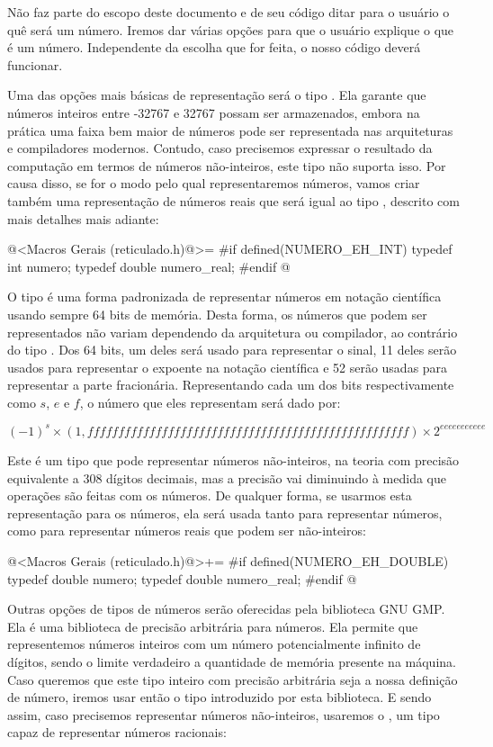 Não faz parte do escopo deste documento e de seu código ditar para o
usuário o quê será um número. Iremos dar várias opções para que o
usuário explique o que é um número. Independente da escolha que for
feita, o nosso código deverá funcionar.

Uma das opções mais básicas de representação será o
tipo . Ela garante que números inteiros entre -32767 e
32767 possam ser armazenados, embora na prática uma faixa bem maior de
números pode ser representada nas arquiteturas e compiladores
modernos. Contudo, caso precisemos expressar o resultado da computação
em termos de números não-inteiros, este tipo não suporta isso. Por
causa disso, se  for o modo pelo qual representaremos
números, vamos criar também uma representação de números reais que
será igual ao tipo , descrito com mais detalhes
mais adiante:

\iniciocodigo
@<Macros Gerais (reticulado.h)@>=
#if defined(NUMERO_EH_INT)
typedef int numero;
typedef double numero_real;
#endif
@
\fimcodigo

O tipo  é uma forma padronizada de representar
números em notação científica usando sempre 64 bits de memória. Desta
forma, os números que podem ser representados não variam dependendo da
arquitetura ou compilador, ao contrário do tipo . Dos
64 bits, um deles será usado para representar o sinal, 11 deles serão
usados para representar o expoente na notação científica e 52 serão
usadas para representar a parte fracionária. Representando cada um dos
bits respectivamente como $s$, $e$ e $f$, o número que eles
representam será dado por:

$$
(-1)^{s}\times(1,ffffffffffffffffffffffffffffffffffffffffffffffffffff)\times2^{eeeeeeeeeee}
$$

Este é um tipo que pode representar números não-inteiros, na teoria
com precisão equivalente a 308 dígitos decimais, mas a precisão vai
diminuindo à medida que operações são feitas com os números. De
qualquer forma, se usarmos esta representação para os números, ela
será usada tanto para representar números, como para representar
números reais que podem ser não-inteiros:

\iniciocodigo
@<Macros Gerais (reticulado.h)@>+=
#if defined(NUMERO_EH_DOUBLE)
typedef double numero;
typedef double numero_real;
#endif
@
\fimcodigo

Outras opções de tipos de números serão oferecidas pela biblioteca GNU
GMP. Ela é uma biblioteca de precisão arbitrária para números. Ela
permite que representemos números inteiros com um número
potencialmente infinito de dígitos, sendo o limite verdadeiro a
quantidade de memória presente na máquina. Caso queremos que este tipo
inteiro com precisão arbitrária seja a nossa definição de número,
iremos usar então o tipo  introduzido por esta
biblioteca. E sendo assim, caso precisemos representar números
não-inteiros, usaremos o , um tipo capaz de
representar números racionais:

